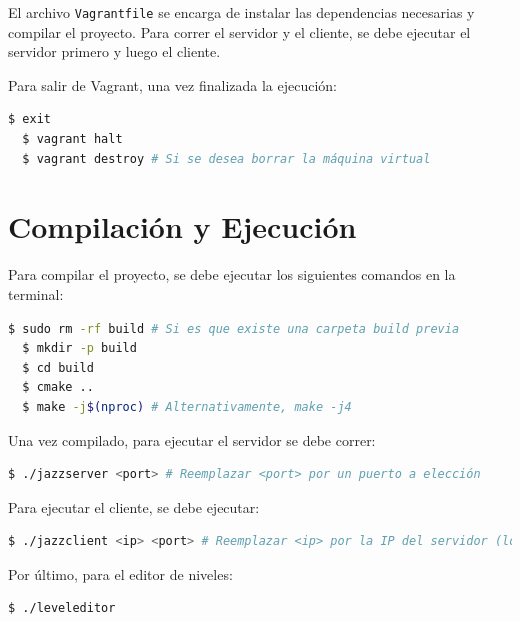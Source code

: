 \documentclass[titlepage,a4paper]{article}
\begin{document}
El archivo \texttt{Vagrantfile} se encarga de instalar las dependencias necesarias y compilar el proyecto. Para correr el servidor y el cliente, se debe ejecutar el servidor primero y luego el cliente.

Para salir de Vagrant, una vez finalizada la ejecución:

\begin{lstlisting}[language=sh,caption=Salir de Vagrant, captionpos=b]
  $ exit
  $ vagrant halt
  $ vagrant destroy # Si se desea borrar la máquina virtual
\end{lstlisting}

\section{Compilación y Ejecución}
Para compilar el proyecto, se debe ejecutar los siguientes comandos en la terminal:

\begin{lstlisting}[language=sh,caption=Compilación del Proyecto, captionpos=b]
  $ sudo rm -rf build # Si es que existe una carpeta build previa
  $ mkdir -p build
  $ cd build
  $ cmake ..
  $ make -j$(nproc) # Alternativamente, make -j4
\end{lstlisting}

Una vez compilado, para ejecutar el servidor se debe correr:

\begin{lstlisting}[language=sh,caption=Ejecución del Servidor, captionpos=b]
  $ ./jazzserver <port> # Reemplazar <port> por un puerto a elección
\end{lstlisting}

Para ejecutar el cliente, se debe ejecutar:

\begin{lstlisting}[language=sh,caption=Ejecución del Cliente, captionpos=b]
  $ ./jazzclient <ip> <port> # Reemplazar <ip> por la IP del servidor (localhost) y <port> por el puerto
\end{lstlisting}

Por último, para el editor de niveles:

\begin{lstlisting}[language=sh,caption=Ejecución del Editor de Niveles, captionpos=b]
  $ ./leveleditor
\end{lstlisting}
\end{document}
